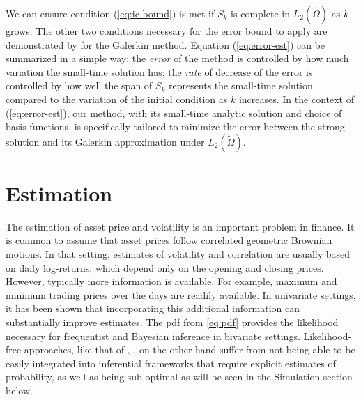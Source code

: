 We can ensure condition (\ref{eq:ic-bound}) is met if $S_k$ is
complete in $L_2(\tilde{\Omega})$ as $k$ grows. The other two conditions
necessary for the error bound to apply are demonstrated by
\cite{bramble1977some} for the Galerkin method. Equation
(\ref{eq:error-est}) can be summarized in a simple way: the
\textit{error} of the method is controlled by how much variation the
small-time solution has; the \textit{rate} of decrease of the error is
controlled by how well the span of $S_k$ represents the small-time
solution compared to the variation of the initial condition as $k$
increases. In the context of (\ref{eq:error-est}), our method, with
its small-time analytic solution and choice of basis functions, is
specifically tailored to minimize the error between the strong
solution and its Galerkin approximation under $L_2(\tilde{\Omega})$.



\section{Estimation}
The estimation of asset price and volatility is an important problem
in finance. It is common to assume that asset prices follow correlated
geometric Brownian motions.  In that setting, estimates of volatility
and correlation are usually based on daily log-returns, which depend
only on the opening and closing prices.  However, typically more
information is available.  For example, maximum and minimum trading
prices over the days are readily available.  In univariate settings,
it has been shown that incorporating this additional information can
substantially improve estimates.  The pdf from \eqref{eq:pdf} provides
the likelihood necessary for frequentist and Bayesian inference in
bivariate settings.  Likelihood-free approaches, like that of
\cite{rogers1991estimating}, \cite{rogers2008estimating}, on the other
hand suffer from not being able to be easily integrated into
inferential frameworks that require explicit estimates of probability,
as well as being sub-optimal as will be seen in the Simulation section
below.

